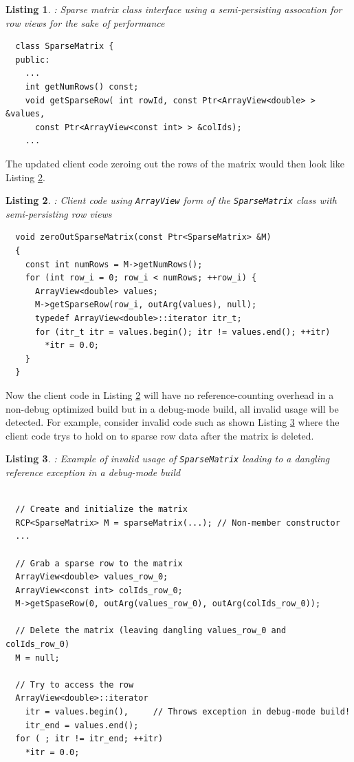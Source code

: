 \documentclass[pdf,ps2pdf,11pt]{SANDreport}
\newtheorem{listing}{Listing}
\begin{document}
\begin{listing}: Sparse matrix class interface using a semi-persisting
assocation for row views for the sake of performance \\
\label{listing:SparseMatrix-ArrayView}
{\small\begin{verbatim}
  class SparseMatrix {
  public:
    ...
    int getNumRows() const;
    void getSparseRow( int rowId, const Ptr<ArrayView<double> > &values,
      const Ptr<ArrayView<const int> > &colIds);
    ...
\end{verbatim}}
\end{listing}


The updated client code zeroing out the rows of the matrix would then
look like Listing {}\ref{listing:zeroOutSparseMatrix-ArrayView}.


\begin{listing}: Client code using {}\texttt{ArrayView} form of the
{}\texttt{SparseMatrix} class with semi-persisting row views  \\
\label{listing:zeroOutSparseMatrix-ArrayView}
{\small\begin{verbatim}
  void zeroOutSparseMatrix(const Ptr<SparseMatrix> &M)
  {
    const int numRows = M->getNumRows();
    for (int row_i = 0; row_i < numRows; ++row_i) {
      ArrayView<double> values;
      M->getSparseRow(row_i, outArg(values), null);
      typedef ArrayView<double>::iterator itr_t;
      for (itr_t itr = values.begin(); itr != values.end(); ++itr)
        *itr = 0.0;
    }
  }
\end{verbatim}}
\end{listing}


Now the client code in Listing
{}\ref{listing:zeroOutSparseMatrix-ArrayView} will have no
reference-counting overhead in a non-debug optimized build but in a
debug-mode build, all invalid usage will be detected.  For example,
consider invalid code such as shown Listing
{}\ref{listing:SparseMatrix-dangling-ref} where the client code trys
to hold on to sparse row data after the matrix is deleted.


\begin{listing}: Example of invalid usage of {}\texttt{SparseMatrix} leading
to a dangling reference exception in a debug-mode build  \\
\label{listing:SparseMatrix-dangling-ref}
{\small\begin{verbatim}

  // Create and initialize the matrix
  RCP<SparseMatrix> M = sparseMatrix(...); // Non-member constructor
  ...

  // Grab a sparse row to the matrix
  ArrayView<double> values_row_0;
  ArrayView<const int> colIds_row_0;
  M->getSpaseRow(0, outArg(values_row_0), outArg(colIds_row_0));

  // Delete the matrix (leaving dangling values_row_0 and colIds_row_0)
  M = null;

  // Try to access the row
  ArrayView<double>::iterator
    itr = values.begin(),     // Throws exception in debug-mode build!
    itr_end = values.end();
  for ( ; itr != itr_end; ++itr)
    *itr = 0.0; 
\end{verbatim}}
\end{listing}
\end{document}
